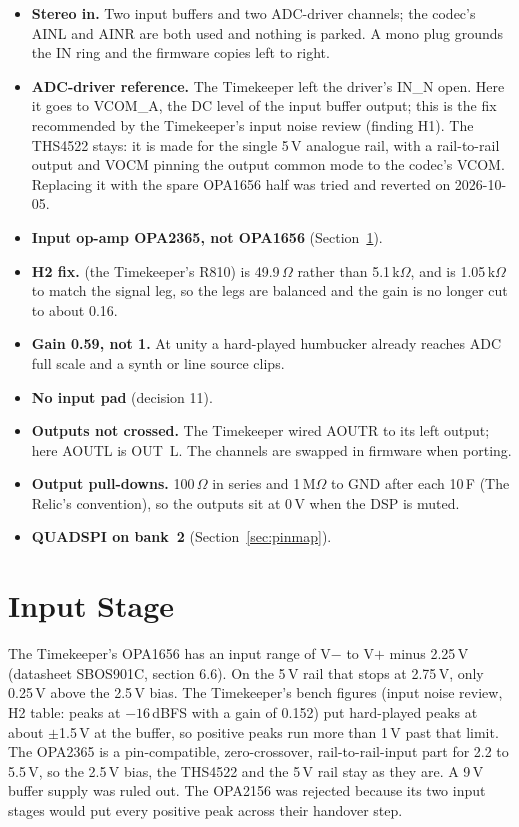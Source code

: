 \begin{itemize}
  \item \textbf{Stereo in.} Two input buffers and two ADC-driver channels; the codec's AINL and AINR are both used and nothing is parked. A mono plug grounds the IN ring and the firmware copies left to right.
  \item \textbf{ADC-driver reference.} The Timekeeper left the driver's IN\_N open. Here it goes to VCOM\_A, the DC level of the input buffer output; this is the fix recommended by the Timekeeper's input noise review (finding H1). The THS4522 stays: it is made for the single 5\,V analogue rail, with a rail-to-rail output and VOCM pinning the output common mode to the codec's VCOM. Replacing it with the spare OPA1656 half was tried and reverted on 2026-10-05.
  \item \textbf{Input op-amp OPA2365, not OPA1656} (Section~\ref{sec:inputstage}).
  \item \textbf{H2 fix.}  (the Timekeeper's R810) is 49.9\,$\Omega$ rather than 5.1\,k$\Omega$, and  is 1.05\,k$\Omega$ to match the signal leg, so the legs are balanced and the gain is no longer cut to about 0.16.
  \item \textbf{Gain 0.59, not 1.} At unity a hard-played humbucker already reaches ADC full scale and a synth or line source clips.
  \item \textbf{No input pad} (decision 11).
  \item \textbf{Outputs not crossed.} The Timekeeper wired AOUTR to its left output; here AOUTL is OUT~L. The channels are swapped in firmware when porting.
  \item \textbf{Output pull-downs.} 100\,$\Omega$ in series and 1\,M$\Omega$ to GND after each 10\,\textmu F (The Relic's convention), so the outputs sit at 0\,V when the DSP is muted.
  \item \textbf{QUADSPI on bank~2} (Section~\ref{sec:pinmap}).
\end{itemize}

\section{Input Stage}\label{sec:inputstage}
The Timekeeper's OPA1656 has an input range of V$-$ to V$+$ minus 2.25\,V (datasheet SBOS901C, section 6.6). On the 5\,V rail that stops at 2.75\,V, only 0.25\,V above the 2.5\,V bias. The Timekeeper's bench figures (input noise review, H2 table: peaks at $-16$\,dBFS with a gain of 0.152) put hard-played peaks at about $\pm$1.5\,V at the buffer, so positive peaks run more than 1\,V past that limit. The OPA2365 is a pin-compatible, zero-crossover, rail-to-rail-input part for 2.2 to 5.5\,V, so the 2.5\,V bias, the THS4522 and the 5\,V rail stay as they are. A 9\,V buffer supply was ruled out. The OPA2156 was rejected because its two input stages would put every positive peak across their handover step.

